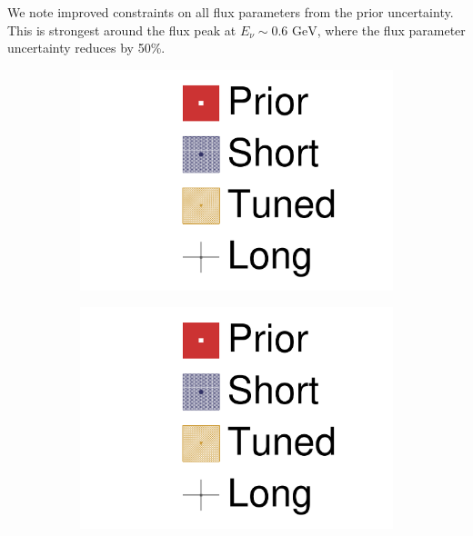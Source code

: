We note improved constraints on all flux parameters from the prior uncertainty. This is strongest around the flux peak at $E_\nu \sim 0.6\text{ GeV}$, where the flux parameter uncertainty reduces by 50\%.
\begin{figure}[h]
	\begin{subfigure}[t]{0.2\textwidth}
		\includegraphics[width=\textwidth, trim={0mm 150mm 50mm 0mm}, clip,page=1]{figures/mach3/Asimov/2017_NewDet_Asimov_actually_0_2017b_NewDet_3Xsec_4Det_5Flux_NewXSecTune_Asimov_0_2017b_NewDet_NewData_Asimov_Long_0}
	\end{subfigure}
\begin{subfigure}[t]{0.2\textwidth}
\includegraphics[width=\textwidth, trim={0mm 100mm 50mm 50mm}, clip,page=1]{figures/mach3/Asimov/2017_NewDet_Asimov_actually_0_2017b_NewDet_3Xsec_4Det_5Flux_NewXSecTune_Asimov_0_2017b_NewDet_NewData_Asimov_Long_0}

\end{subfigure}
\end{figure}
